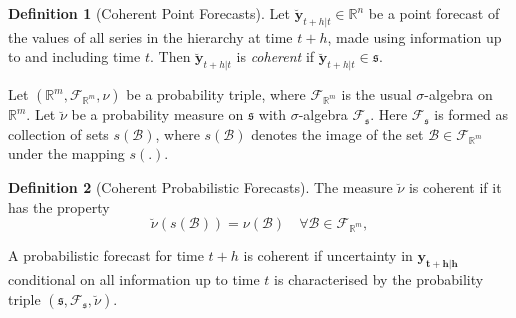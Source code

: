 \documentclass[a4paper, 11pt]{article}
\theoremstyle{theo}
\theoremstyle{definition}
\newtheorem{definition}{Definition}[section]
\begin{document}
\begin{definition}[Coherent Point Forecasts]\label{def:cohpoint}
  Let $\breve{\bm{y}}_{t+h|t} \in \mathbb{R}^n$ be a point forecast of the values of all series in the hierarchy at time $t+h$,  made using information up to and including time $t$.  Then $\breve{\bm{y}}_{t+h|t}$ is \emph{coherent} if $\breve{\bm{y}}_{t+h|t} \in \mathfrak{s}$. 
\end{definition}

Let $(\mathbb{R}^m, \mathscr{F}_{\mathbb{R}^m}, \nu)$ be a probability triple, where $\mathscr{F}_{\mathbb{R}^m}$ is the usual $\sigma$-algebra on $\mathbb{R}^m$. Let $\breve{\nu}$ be a probability measure on $\mathfrak{s}$ with $\sigma$-algebra $\mathscr{F}_{\mathfrak{s}}$.  Here $\mathscr{F}_{\mathfrak{s}}$ is formed as collection of sets $s(\mathcal{B})$, where $s(\mathcal{B})$ denotes the image of the set $\mathcal{B}\in \mathscr{F}_{\mathbb{R}^m}$ under the mapping $s(.)$.

\begin{definition}[Coherent Probabilistic Forecasts]\label{def:cohprob}
  The measure $\breve{\nu}$ is coherent if it has the property
  $$
      \breve{\nu}(s(\mathcal{B})) = \nu(\mathcal{B}) \quad \forall  \mathcal{B} \in \mathscr{F}_{\mathbb{R}^m},
    $$    
\end{definition}
A probabilistic forecast for time $t+h$ is coherent if uncertainty in $\bm{y_{t+h|h}}$ conditional on all information up to time $t$ is characterised by the probability triple $(\mathfrak{s},\mathscr{F}_{\mathfrak{s}},\breve{\nu})$.



\end{document}

